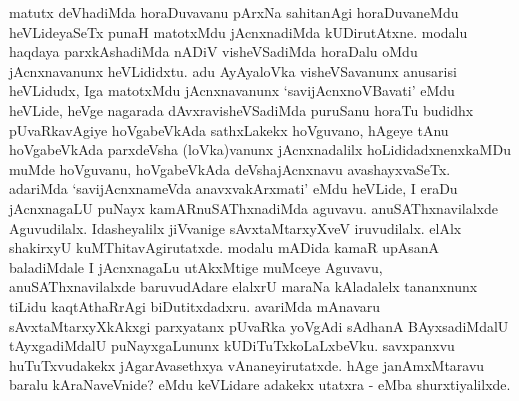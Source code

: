 
\begin{artha}
matutx deVhadiMda horaDuvavanu pArxNa sahitanAgi horaDuvaneMdu heVLideyaSeTx punaH matotxMdu jAcnxnadiMda kUDirutAtxne. modalu haqdaya parxkAshadiMda nADiV visheVSadiMda horaDalu oMdu jAcnxnavanunx heVLididxtu. adu AyAyaloVka visheVSavanunx anusarisi heVLidudx, Iga matotxMdu jAcnxnavanunx `savijAcnxnoVBavati' eMdu heVLide, heVge nagarada dAvxravisheVSadiMda puruSanu horaTu budidhx pUvaRkavAgiye hoVgabeVkAda sathxLakekx hoVguvano, hAgeye tAnu hoVgabeVkAda parxdeVsha (loVka)vanunx jAcnxnadalilx hoLididadxnenxkaMDu muMde hoVguvanu, hoVgabeVkAda deVshajAcnxnavu avashayxvaSeTx. adariMda `savijAcnxnameVda anavxvakArxmati' eMdu heVLide, I eraDu jAcnxnagaLU puNayx kamARnuSAThxnadiMda aguvavu. anuSAThxnavilalxde Aguvudilalx. Idasheyalilx jiVvanige sAvxtaMtarxyXveV iruvudilalx. elAlx shakirxyU kuMThitavAgirutatxde. modalu mADida kamaR upAsanA baladiMdale I jAcnxnagaLu utAkxMtige muMceye Aguvavu, anuSAThxnavilalxde baruvudAdare elalxrU maraNa kAladalelx tananxnunx tiLidu kaqtAthaRrAgi biDutitxdadxru. avariMda mAnavaru sAvxtaMtarxyXkAkxgi parxyatanx pUvaRka yoVgAdi sAdhanA BAyxsadiMdalU tAyxgadiMdalU puNayxgaLununx kUDiTuTxkoLaLxbeVku. savxpanxvu huTuTxvudakekx jAgarAvasethxya vAnaneyirutatxde. hAge janAmxMtaravu baralu kAraNaveVnide? eMdu keVLidare adakekx utatxra - \stext eMba shurxtiyalilxde. 
\end{artha}


